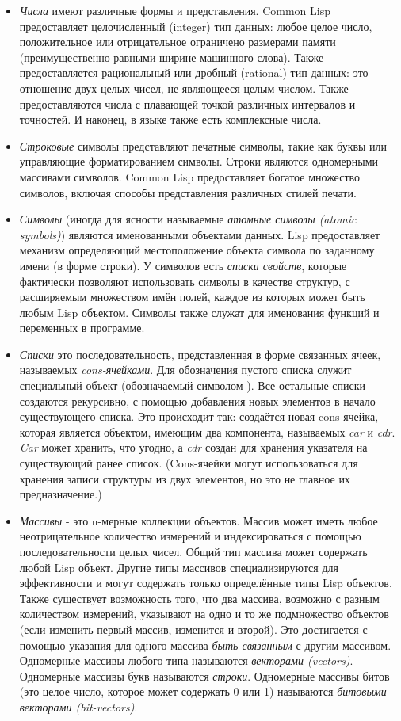 \begin{itemize}
\item
\emph{Числа} имеют различные формы и представления. Common Lisp
предоставляет целочисленный (integer) тип данных: любое целое
число, положительное или отрицательное ограничено размерами памяти
(преимущественно равными ширине машинного слова). Также
предоставляется рациональный или дробный (rational) тип данных:
это отношение двух целых чисел, не являющееся целым числом. Также
предоставляются числа с плавающей точкой различных интервалов и
точностей. И наконец, в языке также есть комплексные числа. 

\item
\emph{Строковые} символы представляют печатные символы, такие как
буквы или управляющие форматированием символы. Строки являются
одномерными массивами символов. Common Lisp предоставляет богатое
множество символов, включая способы представления различных
стилей печати. 

\item
\emph{Символы} (иногда для ясности называемые \emph{атомные символы (atomic
  symbols)})
являются именованными объектами данных. Lisp предоставляет
механизм определяющий местоположение объекта символа по заданному
имени (в форме строки). У символов есть \emph{списки свойств},
которые фактически позволяют использовать символы в качестве
структур, с расширяемым множеством имён полей, каждое из которых
может быть любым Lisp объектом. Символы также служат для
именования функций и переменных в программе. 

\item
\emph{Списки}  это последовательность, представленная в форме связанных
ячеек, называемых \emph{cons-ячейками}. Для обозначения пустого
списка служит специальный объект (обозначаемый символом
{\nil}). Все остальные списки создаются рекурсивно, с помощью
добавления новых элементов в начало существующего списка. Это
происходит так: создаётся новая cons-ячейка, которая является
объектом, имеющим два компонента, называемых \emph{car} и \emph{cdr}. \emph{Car}
может хранить, что угодно, а \emph{cdr} создан для хранения 
указателя на существующий ранее список. (Cons-ячейки могут
использоваться для хранения записи структуры из двух
элементов, но это не главное их предназначение.) 

\item
\emph{Массивы} - это n-мерные коллекции объектов. Массив может
иметь любое неотрицательное количество измерений и индексироваться
с помощью последовательности целых чисел. Общий тип массива может
содержать любой Lisp объект. Другие типы массивов специализируются
для эффективности и могут содержать только определённые типы Lisp
объектов. Также существует возможность того, что два массива,
возможно с разным количеством измерений, указывают на одно и то же
подмножество объектов (если изменить первый массив, изменится и
второй). Это достигается с помощью указания для одного массива
\emph{быть связанным} с другим массивом. Одномерные массивы
любого типа называются \emph{векторами (vectors)}. Одномерные
массивы букв называются \emph{строки}. Одномерные
массивы битов (это целое число, которое может содержать 0 или 1)
называются \emph{битовыми векторами (bit-vectors)}. 


\end{itemize}

